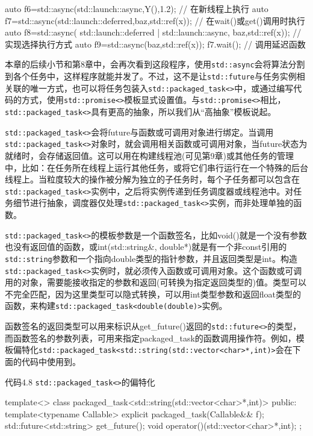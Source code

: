 \begin{cpp}
auto f6=std::async(std::launch::async,Y(),1.2);  // 在新线程上执行
auto f7=std::async(std::launch::deferred,baz,std::ref(x));  // 在wait()或get()调用时执行
auto f8=std::async(
              std::launch::deferred | std::launch::async,
              baz,std::ref(x));  // 实现选择执行方式
auto f9=std::async(baz,std::ref(x));
f7.wait();  //  调用延迟函数
\end{cpp}

本章的后续小节和第8章中，会再次看到这段程序，使用\texttt{std::async}会将算法分割到各个任务中，这样程序就能并发了。不过，这不是让\texttt{std::future}与任务实例相关联的唯一方式，也可以将任务包装入\texttt{std::packaged\_task<>}中，或通过编写代码的方式，使用\texttt{std::promise<>}模板显式设置值。与\texttt{std::promise<>}相比，\texttt{std::packaged\_task<>}具有更高的抽象，所以我们从“高抽象”模板说起。


\texttt{std::packaged\_task<>}会将future与函数或可调用对象进行绑定。当调用\texttt{std::packaged\_task<>}对象时，就会调用相关函数或可调用对象，当future状态为就绪时，会存储返回值。这可以用在构建线程池(可见第9章)或其他任务的管理中，比如：在任务所在线程上运行其他任务，或将它们串行运行在一个特殊的后台线程上。当粒度较大的操作被分解为独立的子任务时，每个子任务都可以包含在\texttt{std::packaged\_task<>}实例中，之后将实例传递到任务调度器或线程池中。对任务细节进行抽象，调度器仅处理\texttt{std::packaged\_task<>}实例，而非处理单独的函数。

\texttt{std::packaged\_task<>}的模板参数是一个函数签名，比如void()就是一个没有参数也没有返回值的函数，或int(std::string\&, double*)就是有一个非const引用的\texttt{std::string}参数和一个指向double类型的指针参数，并且返回类型是int。构造\texttt{std::packaged\_task<>}实例时，就必须传入函数或可调用对象。这个函数或可调用的对象，需要能接收指定的参数和返回(可转换为指定返回类型的)值。类型可以不完全匹配，因为这里类型可以隐式转换，可以用int类型参数和返回float类型的函数，来构建\texttt{std::packaged\_task<double(double)>}实例。

函数签名的返回类型可以用来标识从get\_future()返回的\texttt{std::future<>}的类型，而函数签名的参数列表，可用来指定packaged\_task的函数调用操作符。例如，模板偏特化\texttt{std::packaged\_task<std::string(std::vector<char>*,int)>}会在下面的代码中使用到。

代码4.8 \texttt{std::packaged\_task<>}的偏特化

\begin{cpp}
template<>
class packaged_task<std::string(std::vector<char>*,int)>
{
public:
  template<typename Callable>
  explicit packaged_task(Callable&& f);
  std::future<std::string> get_future();
  void operator()(std::vector<char>*,int);
};
\end{cpp}

